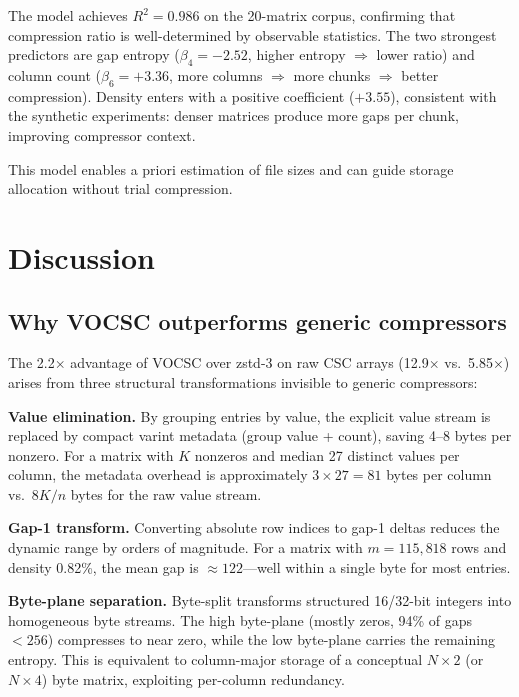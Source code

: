 \documentclass[10pt,twocolumn,letterpaper]{article}
\begin{document}
The model achieves $R^2 = 0.986$ on the 20-matrix corpus, confirming that compression ratio is well-determined by observable statistics.
The two strongest predictors are gap entropy ($\beta_4 = -2.52$, higher entropy $\Rightarrow$ lower ratio) and column count ($\beta_6 = +3.36$, more columns $\Rightarrow$ more chunks $\Rightarrow$ better compression).
Density enters with a positive coefficient ($+3.55$), consistent with the synthetic experiments: denser matrices produce more gaps per chunk, improving compressor context.

This model enables a priori estimation of file sizes and can guide storage allocation without trial compression.

\section{Discussion}

\subsection{Why VOCSC outperforms generic compressors}

The 2.2$\times$ advantage of VOCSC over zstd-3 on raw CSC arrays (12.9$\times$ vs.\ 5.85$\times$) arises from three structural transformations invisible to generic compressors:

\textbf{Value elimination.} By grouping entries by value, the explicit value stream is replaced by compact varint metadata (group value + count), saving 4--8 bytes per nonzero. For a matrix with $K$ nonzeros and median 27 distinct values per column, the metadata overhead is approximately $3 \times 27 = 81$ bytes per column vs.\ $8K/n$ bytes for the raw value stream.

\textbf{Gap-1 transform.} Converting absolute row indices to gap-1 deltas reduces the dynamic range by orders of magnitude. For a matrix with $m = 115{,}818$ rows and density 0.82\%, the mean gap is $\approx 122$---well within a single byte for most entries.

\textbf{Byte-plane separation.} Byte-split transforms structured 16/32-bit integers into homogeneous byte streams. The high byte-plane (mostly zeros, 94\% of gaps $< 256$) compresses to near zero, while the low byte-plane carries the remaining entropy. This is equivalent to column-major storage of a conceptual $N \times 2$ (or $N \times 4$) byte matrix, exploiting per-column redundancy.
\end{document}
